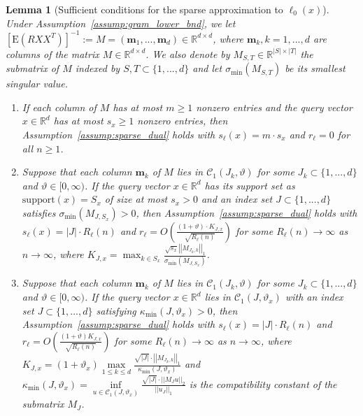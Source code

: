 \documentclass[ejsv2,noshowframe]{imsart}
\theoremstyle{plain}
\newtheorem{lemma}[theorem]{Lemma}
\theoremstyle{definition}
\theoremstyle{remark}
\newcommand{\norm}[1]{\left|\left| #1 \right|\right|}
\begin{document}
\begin{lemma}[Sufficient conditions for the sparse approximation to $\ell_0(x)$]
	\label{lem:suff_sparse_dual}
	Under Assumption~\ref{assump:gram_lower_bnd}, we let $\left[\mathrm{E}(RXX^T) \right]^{-1}:=M=(\bm{m}_1,...,\bm{m}_d) \in \mathbb{R}^{d\times d}$, where $\bm{m}_k,k=1,...,d$ are columns of the matrix $M\in \mathbb{R}^{d\times d}$. We also denote by $M_{S,T} \in \mathbb{R}^{|S|\times |T|}$ the submatrix of $M$ indexed by $S,T \subset \{1,...,d\}$ and let $\sigma_{\min}(M_{S,T})$ be its smallest singular value.
	\begin{enumerate}[label=(\alph*)]
		\item If each column of $M$ has at most $m\geq 1$ nonzero entries and the query vector $x\in \mathbb{R}^d$ has at most $s_x\geq 1$ nonzero entries, then Assumption~\ref{assump:sparse_dual} holds with $s_{\ell}(x)=m\cdot s_x$ and $r_{\ell}=0$ for all $n\geq 1$.
		
		\item Suppose that each column $\bm{m}_k$ of $M$ lies in $\mathcal{C}_1(J_k,\vartheta)$ for some $J_k\subset \{1,...,d\}$ and $\vartheta\in [0,\infty)$. If the query vector $x\in \mathbb{R}^d$ has its support set as $\mathrm{support}(x)=S_x$ of size at most $s_x>0$ and an index set $J \subset \{1,...,d\}$ satisfies $\sigma_{\min}(M_{J,S_x}) >0$, then Assumption~\ref{assump:sparse_dual} holds with $s_{\ell}(x) = |J|\cdot R_{\ell}(n)$ and $r_{\ell}=O\left(\frac{(1+\vartheta) \cdot K_{J,x}}{\sqrt{R_{\ell}(n)}}\right)$ for some $R_{\ell}(n) \to \infty$ as $n\to \infty$, where $K_{J,x} = \max_{k\in S_x} \frac{\sqrt{s_x} \norm{M_{J_k,k}}_1}{\sigma_{\min}(M_{J,S_x})}$. 
		
		\item Suppose that each column $\bm{m}_k$ of $M$ lies in $\mathcal{C}_1(J_k,\vartheta)$ for some $J_k\subset \{1,...,d\}$ and $\vartheta \in [0,\infty)$. If the query vector $x\in \mathbb{R}^d$ lies in $\mathcal{C}_1(J,\vartheta_x)$ with an index set $J \subset \{1,...,d\}$ satisfying $\kappa_{\min}(J,\vartheta_x) >0$, then Assumption~\ref{assump:sparse_dual} holds with $s_{\ell}(x) = |J|\cdot R_{\ell}(n)$ and $r_{\ell}=O\left(\frac{(1+\vartheta) K_{J,x}}{\sqrt{R_{\ell}(n)}}\right)$ for some $R_{\ell}(n) \to \infty$ as $n\to \infty$, where $K_{J,x} = (1+\vartheta_x)\max\limits_{1\leq k \leq d}\frac{\sqrt{|J|}\cdot\norm{M_{J_k,k}}_1}{\kappa_{\min}(J,\vartheta_x)}$ and $\kappa_{\min}(J,\vartheta_x)=\inf\limits_{u\in \mathcal{C}_1(J,\vartheta_x)} \frac{\sqrt{|J|}\cdot \norm{M_Ju}_2}{\norm{u_J}_1}$ is the compatibility constant of the submatrix $M_J$.
	\end{enumerate}
\end{lemma}
\end{document}

